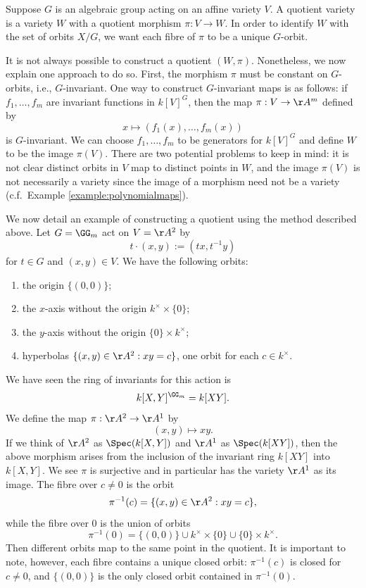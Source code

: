 \documentclass[12pt]{amsart}
\theoremstyle{plain}
\begin{document}
Suppose $G$ is an algebraic group acting on an affine variety $V$.
A quotient variety is a variety $W$ with a quotient morphism $\pi : V \to W$.
In order to identify $W$ with the set of orbits $X / G$, we want each fibre of $\pi$ to be a unique $G$-orbit.

It is not always possible to construct a quotient $(W, \pi)$.
Nonetheless, we now explain one approach to do so.
First, the morphism $\pi$ must be constant on $G$-orbits, i.e., $G$-invariant.
One way to construct $G$-invariant maps is as follows:
if $f_1, \ldots, f_m$ are invariant functions in $k[V]^G$, then the map $\pi : V \to \AA^m$ defined by
$$x \mapsto (f_1(x), \ldots, f_m(x))$$
is $G$-invariant.
We can choose $f_1, \ldots, f_m$ to be generators for $k[V]^G$ and define $W$ to be the image $\pi(V)$.
There are two potential problems to keep in mind: it is not clear distinct orbits in $V$ map to distinct points in $W$, and the image $\pi(V)$ is not necessarily a variety since the image of a morphism need not be a variety (c.f.\ Example \ref{example:polynomialmaps}).

We now detail an example of constructing a quotient using the method described above.
Let $G = \GG_m $ act on $V = \AA^2$ by
$$t \cdot (x, y) := (tx, t^{-1}y)$$
for $t \in G$ and $(x, y) \in V$.
We have the following orbits:
\begin{enumerate}
\item the origin $\{(0, 0)\}$;
\item the $x$-axis without the origin $k^\times \times \{0\}$;
\item the $y$-axis without the origin $\{0\} \times k^\times$;
\item hyperbolas $\{(x, y) \in \AA^2 : xy = c\}$, one orbit for each $c \in k^\times$. 
\end{enumerate}	
We have seen the ring of invariants for this action is
$$k[X,Y]^{\GG_m} = k[XY].$$
We define the map $\pi : \AA^2 \to \AA^1$ by
$$(x, y) \mapsto xy.$$
If we think of $\AA^2$ as $\Spec(k[X, Y])$ and $\AA^1$ as $\Spec(k[XY])$, then the above morphism arises from the inclusion of the invariant ring $k[XY]$ into $k[X, Y]$.
We see $\pi$ is surjective and in particular has the variety $\AA^1$ as its image.
The fibre over $c \ne 0$ is the orbit
$$\pi^{-1}(c) = \{(x, y) \in \AA^2 : xy = c\},$$
while the fibre over $0$ is the union of orbits
$$\pi^{-1}(0) = \{(0, 0)\} \cup k^\times \times \{0\} \cup \{0\} \times k^\times.$$
Then different orbits map to the same point in the quotient.
It is important to note, however, each fibre contains a unique closed orbit: $\pi^{-1}(c)$ is closed for $c \ne 0$, and $\{(0, 0)\}$ is the only closed orbit contained in $\pi^{-1}(0)$.
\end{document}
